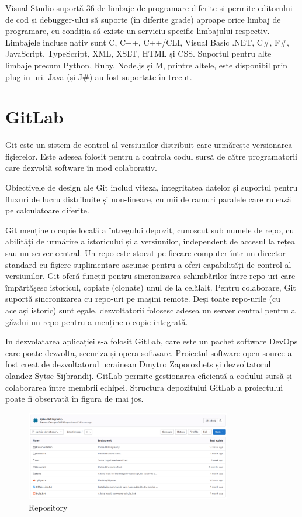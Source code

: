 \documentclass[a4paper,12pt]{report}
\begin{document}
Visual Studio suportă 36 de limbaje de programare diferite și permite editorului de cod și debugger-ului să suporte (în diferite grade) aproape orice limbaj de programare, cu condiția să existe un serviciu specific limbajului respectiv. Limbajele incluse nativ sunt C, C++, C++/CLI, Visual Basic .NET, C\#, F\#, JavaScript, TypeScript, XML, XSLT, HTML și CSS. Suportul pentru alte limbaje precum Python, Ruby, Node.js și M, printre altele, este disponibil prin plug-in-uri. Java (și J\#) au fost suportate în trecut.

\section{GitLab}
Git este un sistem de control al versiunilor distribuit care urmărește versionarea fișierelor. Este adesea folosit pentru a controla codul sursă de către programatorii care dezvoltă software în mod colaborativ.

Obiectivele de design ale Git includ viteza, integritatea datelor și suportul pentru fluxuri de lucru distribuite și non-lineare, cu mii de ramuri paralele care rulează pe calculatoare diferite.

Git menține o copie locală a întregului depozit, cunoscut sub numele de repo, cu abilități de urmărire a istoricului și a versiunilor, independent de accesul la rețea sau un server central. Un repo este stocat pe fiecare computer într-un director standard cu fișiere suplimentare ascunse pentru a oferi capabilități de control al versiunilor. Git oferă funcții pentru sincronizarea schimbărilor între repo-uri care împărtășesc istoricul, copiate (clonate) unul de la celălalt. Pentru colaborare, Git suportă sincronizarea cu repo-uri pe mașini remote. Deși toate repo-urile (cu același istoric) sunt egale, dezvoltatorii folosesc adesea un server central pentru a găzdui un repo pentru a menține o copie integrată.

In dezvolatarea aplicației s-a folosit GitLab, care este un pachet software DevOps care poate dezvolta, securiza și opera software. Proiectul software open-source a fost creat de dezvoltatorul ucrainean Dmytro Zaporozhets și dezvoltatorul olandez Sytse Sijbrandij. GitLab permite gestionarea eficientă a codului sursă și colaborarea între membrii echipei. Structura depozitului GitLab a proiectului poate fi observată în figura de mai jos.

\begin{figure}[h!]
    \centering
    \includegraphics[width=0.8\textwidth]{images/gitlab.jpg}
    \caption{Repository}
\end{figure}
\FloatBarrier
\end{document}
